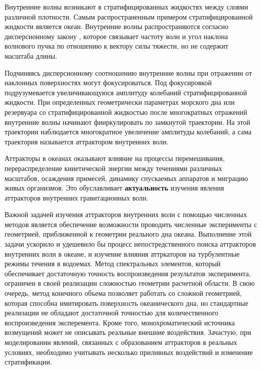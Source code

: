 \Introduction

Внутренние волны возникают в стратифицированных жидкостях между слоями различной плотности. Самым распространенным примером стратифицированной жидкости является океан.  Внутренние волны распространяются согласно дисперсионному закону \cite{MowbrayRarity1967}, которое связывает частоту волн и угол наклона волнового пучка по отношению к вектору силы тяжести, но не содержит масштаба длины. 

Подчиняясь дисперсионному соотношению внутренние волны при отражении от наклонных поверхностях могут фокусироваться. Под фокусировкой подрузумевается увеличивающуюся амплитуду колебаний стратифицированной жидкости. При определенных геометрически параметрах морского дна или резервуара со стратифицированной жидкостью после многократных отражений внутренние волны начинают фииркулировать по замкнутой траектории. На этой траектории наблюдается многократное увеличение амплитуды колебаний, а сама траектория называется аттрактором внутренних волн.

Аттракторы в океанах оказывают влияние на процессы перемешивания, перераспределение кинетической энергии между течениями различных масштабов, осаждения примесей, динамику спускаемых аппаратов и миграцию живых организмов. Это обуславливает \textbf{актуальность} изучения явления аттракторов внутренних гравитационных волн.

Важной задачей изучения аттракторов внутренних волн с помощью численных методов является обеспечение возможности проводить численные эксперименты с геометрией, приближенной к геометрии реального дна океана. Выполнение этой задачи ускорило и удешевило бы процесс непостредственного поиска аттракторов внутренних волн в океане, и изучение влияния аттркаторов на турбулентные режимы течения в водоемах. Метод спектральных элементов, который обеспечивает достаточную точность воспроизведения результатов эксперимента, ограничен в своей реализации сложностью геометрии расчетной области. В свою очередь, метод конечного объема позволяет работать со сложной геометрией, которая способна имитировать поверхность океанического дна, но стандартные реализации не обладают достаточной точностью для количественного воспроизведения эксперемента. Кроме того, монохроматический источника возмущений может не описывать реальные внешние воздействия. Зачастую, при моделировании явлений, связанных с образованием аттракторов в реальных условиях, необходимо учитывать несколько приливных воздействий \cite{Garrett1972} и изменение стратификации.

